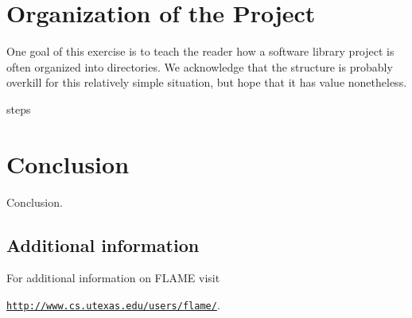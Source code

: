 \cite{Goto:2008:AHP}
\cite{BLIS1}
\cite{BLIS2}
\cite{BLIS3}
\cite{BLIS4}

\section{Organization of the Project}



One goal of this exercise is to teach the reader how a software library project is often organized into directories.  We acknowledge that the structure is probably overkill for this relatively simple situation, but hope that it has value nonetheless.



 {steps}


\section{Conclusion}
\label{sec:conclusion}

Conclusion.


\subsection*{Additional information}

For additional information on FLAME visit
\begin{center}
\href{http://www.cs.utexas.edu/users/flame/}
     {\tt http://www.cs.utexas.edu/users/flame/}.
\end{center}
